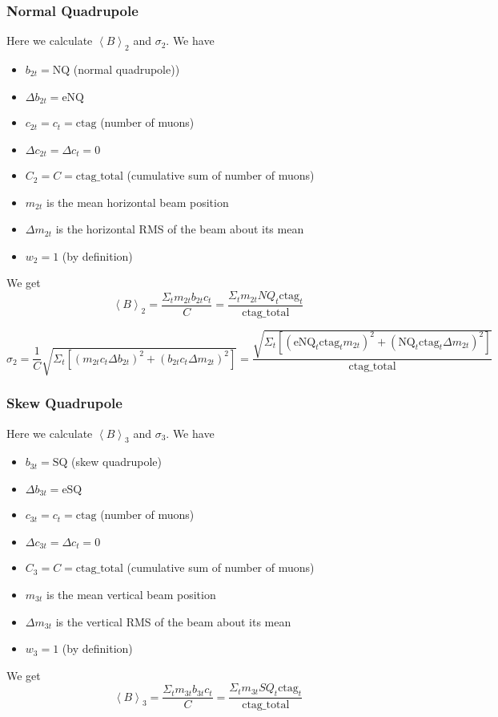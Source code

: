 \documentclass[twoside]{article}
\begin{document}
\subsubsection{Normal Quadrupole}
Here we calculate  $\left\langle B \right\rangle_2$ and $\sigma_2$. We have
\begin{itemize}
	\item $b_{2t} = \text{NQ}$ (normal quadrupole))
	\item $\Delta b_{2t} = \text{eNQ}$ 
	\item $c_{2t} = c_t = \text{ctag}$ (number of muons)
	\item $\Delta c_{2t} = \Delta c_t = 0$ 
	\item $C_{2} = C = \text{ctag\_total}$  (cumulative sum of number of muons)
	\item $m_{2t}$  is the mean horizontal beam position
	\item $\Delta m_{2t}$ is the horizontal RMS of the beam about its mean 
	\item $w_{2} = 1$ (by definition)
\end{itemize}
We get
\begin{equation}
\left\langle B \right\rangle_2 =
\frac{\Sigma_{t} m_{2t} b_{2t} c_{t}}{C} = 
\frac{\Sigma_{t} m_{2t} NQ_t \text{ctag}_{t}}{\text{ctag\_total}}
\end{equation}

\begin{equation}
	\sigma_{2} =
	 \frac{1}{C} \sqrt{\Sigma_t  [(m_{2t} c_{t} \Delta b_{2t})^2 + (b_{2t} c_{t} \Delta m_{2t})^2  ]} =
	 \frac{\sqrt{\Sigma_t  [(\text{eNQ}_t  \text{ctag}_t m_{2t} )^2 + (\text{NQ}_t  \text{ctag}_t \Delta m_{2t})^2  ]} }{\text{ctag\_total}}
\end{equation}



\subsubsection{Skew Quadrupole}
Here we calculate  $\left\langle B \right\rangle_3$ and $\sigma_3$. We have
\begin{itemize}
	\item $b_{3t} = \text{SQ}$ (skew quadrupole)
	\item $\Delta b_{3t} = \text{eSQ}$ 
	\item $c_{3t} = c_t = \text{ctag}$ (number of muons)
	\item $\Delta c_{3t} = \Delta c_t = 0$ 
	\item $C_{3} = C = \text{ctag\_total}$  (cumulative sum of number of muons) 
	\item $m_{3t}$  is the mean vertical beam position
	\item $\Delta m_{3t}$ is the vertical RMS of the beam about its mean 
	\item $w_{3} = 1$ (by definition)
\end{itemize}
We get
\begin{equation}
\left\langle B \right\rangle_3 =
\frac{\Sigma_{t} m_{3t} b_{3t} c_{t}}{C} = 
\frac{\Sigma_{t} m_{3t} SQ_t \text{ctag}_{t}}{\text{ctag\_total}}
\end{equation}
\end{document}

